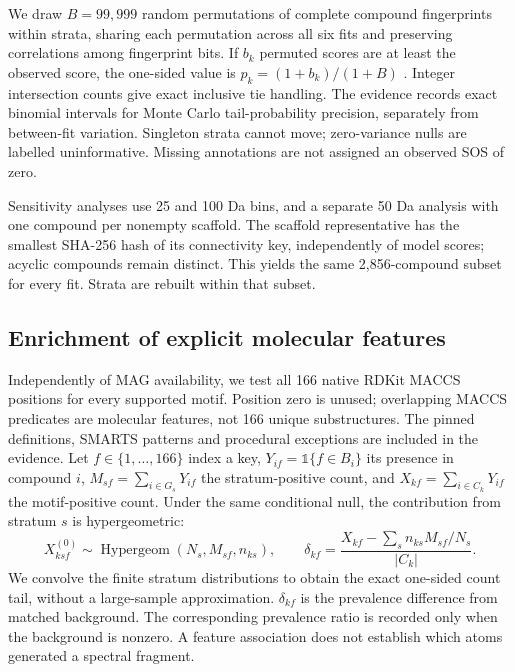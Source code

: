 \documentclass[10pt,a4paper]{article}
\begin{document}
We draw $B=99,999$ random permutations of complete compound fingerprints
within strata, sharing each permutation across all six fits and preserving
correlations among fingerprint bits. If $b_k$ permuted scores are at least
the observed score, the one-sided value is
$p_k=(1+b_k)/(1+B)$ \cite{phipson2010}. Integer intersection counts give
exact inclusive tie handling. The evidence records exact binomial intervals
for Monte Carlo tail-probability precision, separately from between-fit
variation. Singleton strata cannot move; zero-variance nulls are labelled
uninformative. Missing annotations are not assigned an observed SOS of zero.

Sensitivity analyses use 25 and 100 Da bins, and a separate 50 Da analysis
with one compound per nonempty scaffold. The scaffold representative has
the smallest SHA-256 hash of its connectivity key, independently of model
scores; acyclic compounds remain distinct. This yields the same 2,856-compound
subset for every fit. Strata are rebuilt within that subset.

\subsection{Enrichment of explicit molecular features}

Independently of MAG availability, we test all 166 native RDKit MACCS
positions for every supported motif. Position zero is unused; overlapping
MACCS predicates are molecular features, not 166 unique substructures.
The pinned definitions, SMARTS patterns and procedural exceptions are
included in the evidence. Let $f\in\{1,\ldots,166\}$ index a key,
$Y_{if}=\mathbb{1}\{f\in B_i\}$ its presence in compound $i$,
$M_{sf}=\sum_{i\in G_s}Y_{if}$ the stratum-positive count, and
$X_{kf}=\sum_{i\in C_k}Y_{if}$ the motif-positive count. Under the same
conditional null, the contribution from stratum $s$ is hypergeometric:
\begin{equation}
 X^{(0)}_{ksf}\sim\operatorname{Hypergeom}(N_s,M_{sf},n_{ks}),
 \qquad
 \delta_{kf}=\frac{X_{kf}-\sum_s n_{ks}M_{sf}/N_s}{|C_k|}.
 \label{eq:feature-enrichment}
\end{equation}
We convolve the finite stratum distributions to obtain the exact
one-sided count tail, without a large-sample approximation.
$\delta_{kf}$ is the prevalence difference from matched background.
The corresponding prevalence ratio is recorded only when the background
is nonzero. A feature association does not establish which atoms generated
a spectral fragment.
\end{document}
